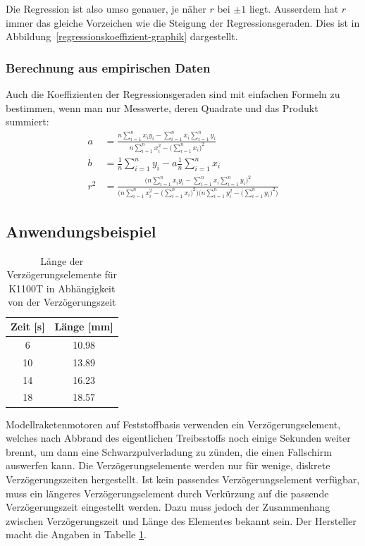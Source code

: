 Die Regression ist also umso genauer, je näher $r$ bei $\pm 1$ liegt.
Ausserdem hat $r$ immer das gleiche Vorzeichen wie die
Steigung der Regressionsgeraden.
Dies ist in Abbildung~\ref{regressionskoeffizient-graphik} dargestellt.

\subsubsection{Berechnung aus empirischen Daten}
Auch die Koeffizienten der Regressionsgeraden sind mit einfachen Formeln
zu bestimmen, wenn man nur Messwerte, deren Quadrate und das Produkt summiert:
\begin{align*}
a&=\frac{\displaystyle n\sum_{i=1}^nx_iy_i-\sum_{i=1}^nx_i\sum_{i=1}^ny_i}{\displaystyle n\sum_{i=1}^nx_i^2-\biggl(\sum_{i=1}^nx_i\biggr)^2}\\
b&=\frac1n\sum_{i=1}^ny_i-a\frac1n\sum_{i=1}^nx_i\\
r^2
&=
\frac{
\displaystyle
\biggl(n\sum_{i=1}^n x_iy_i-\sum_{i=1}^n x_i\sum_{i=1}^ny_i\biggr)^2
}{
\displaystyle
\biggl(n\sum_{i=1}^nx_i^2-\biggl(\sum_{i=1}^nx_i\biggr)^2\biggr)
\biggl(n\sum_{i=1}^ny_i^2-\biggl(\sum_{i=1}^ny_i\biggr)^2\biggr)
}
\end{align*}

\subsection{Anwendungsbeispiel}
\begin{table}
\begin{center}
\begin{tabular}{|c|c|}
\hline
Zeit [s]&Länge [mm]\\
\hline
6&10.98\\
10&13.89\\
14&16.23\\
18&18.57\\
\hline
\end{tabular}
\end{center}
\caption{Länge der Verzögerungselemente für K1100T in Abhängigkeit von der
Verzögerungszeit\label{delaylengths}}
\end{table}
Modellraketenmotoren auf Feststoffbasis verwenden ein Verzögerungselement,
welches nach Abbrand des eigentlichen Treibsstoffs noch einige Sekunden
weiter brennt, um dann eine Schwarzpulverladung zu zünden, die einen Fallschirm
auswerfen kann.
Die Verzögerungselemente werden nur für wenige, diskrete
Verzögerungszeiten hergestellt.
Ist kein passendes Verzögerungselement
verfügbar, muss
ein längeres Verzögerungselement durch Verkürzung auf die passende
Verzögerungszeit eingestellt werden.
Dazu muss jedoch der Zusammenhang
zwischen Verzögerungszeit und Länge des Elementes bekannt sein.
Der Hersteller macht die Angaben in Tabelle \ref{delaylengths}.

